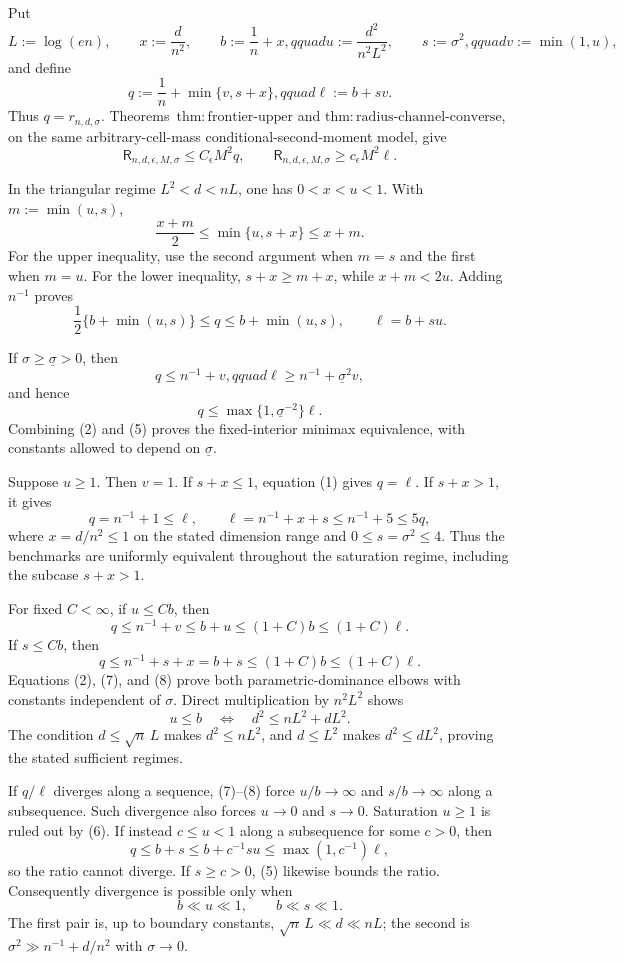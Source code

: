 Put
\[
 L:=\log(en),\qquad x:=\frac d{n^2},\qquad
 b:=\frac1n+x,qquad u:=\frac{d^2}{n^2L^2},
 \qquad s:=\sigma^2,qquad v:=\min(1,u),
\]
and define
\[
 q:=\frac1n+\min\{v,s+x\},qquad \ell:=b+sv.
\tag{1}
\]
Thus \(q=r_{n,d,\sigma}\).  Theorems~\(\mathrm{thm:frontier\text{-}upper}\) and \(\mathrm{thm:radius\text{-}channel\text{-}converse}\), on the same arbitrary-cell-mass conditional-second-moment model, give
\[
 \mathsf R_{n,d,\epsilon,M,\sigma}\le C_\epsilon M^2q,
 \qquad
 \mathsf R_{n,d,\epsilon,M,\sigma}\ge c_\epsilon M^2\ell.
\tag{2}
\]

In the triangular regime \(L^2<d<nL\), one has \(0<x<u<1\).  With \(m:=\min(u,s)\),
\[
 \frac{x+m}{2}\le\min\{u,s+x\}\le x+m.
\tag{3}
\]
For the upper inequality, use the second argument when \(m=s\) and the first when \(m=u\).  For the lower inequality, \(s+x\ge m+x\), while \(x+m<2u\).  Adding \(n^{-1}\) proves
\[
 \frac12\{b+\min(u,s)\}\le q\le b+\min(u,s),
 \qquad \ell=b+su.
\tag{4}
\]

If \(\sigma\ge\underline\sigma>0\), then
\[
 q\le n^{-1}+v,qquad
 \ell\ge n^{-1}+\underline\sigma^2v,
\]
and hence
\[
 q\le\max\{1,\underline\sigma^{-2}\}\ell.
\tag{5}
\]
Combining (2) and (5) proves the fixed-interior minimax equivalence, with constants allowed to depend on \(\underline\sigma\).

Suppose \(u\ge1\).  Then \(v=1\).  If \(s+x\le1\), equation (1) gives \(q=\ell\).  If \(s+x>1\), it gives
\[
 q=n^{-1}+1\le\ell,
 \qquad
 \ell=n^{-1}+x+s\le n^{-1}+5\le5q,
\tag{6}
\]
where \(x=d/n^2\le1\) on the stated dimension range and \(0\le s=\sigma^2\le4\).  Thus the benchmarks are uniformly equivalent throughout the saturation regime, including the subcase \(s+x>1\).

For fixed \(C<\infty\), if \(u\le Cb\), then
\[
 q\le n^{-1}+v\le b+u\le(1+C)b\le(1+C)\ell.
\tag{7}
\]
If \(s\le Cb\), then
\[
 q\le n^{-1}+s+x=b+s\le(1+C)b\le(1+C)\ell.
\tag{8}
\]
Equations (2), (7), and (8) prove both parametric-dominance elbows with constants independent of \(\sigma\).  Direct multiplication by \(n^2L^2\) shows
\[
 u\le b\quad\Longleftrightarrow\quad d^2\le nL^2+dL^2.
\tag{9}
\]
The condition \(d\le\sqrt n\,L\) makes \(d^2\le nL^2\), and \(d\le L^2\) makes \(d^2\le dL^2\), proving the stated sufficient regimes.

If \(q/\ell\) diverges along a sequence, (7)--(8) force \(u/b\to\infty\) and \(s/b\to\infty\) along a subsequence.  Such divergence also forces \(u\to0\) and \(s\to0\).  Saturation \(u\ge1\) is ruled out by (6).  If instead \(c\le u<1\) along a subsequence for some \(c>0\), then
\[
 q\le b+s\le b+c^{-1}su\le\max(1,c^{-1})\ell,
\]
so the ratio cannot diverge.  If \(s\ge c>0\), (5) likewise bounds the ratio.  Consequently divergence is possible only when
\[
 b\ll u\ll1,
 \qquad
 b\ll s\ll1.
\tag{10}
\]
The first pair is, up to boundary constants, \(\sqrt n\,L\ll d\ll nL\); the second is \(\sigma^2\gg n^{-1}+d/n^2\) with \(\sigma\to0\).

